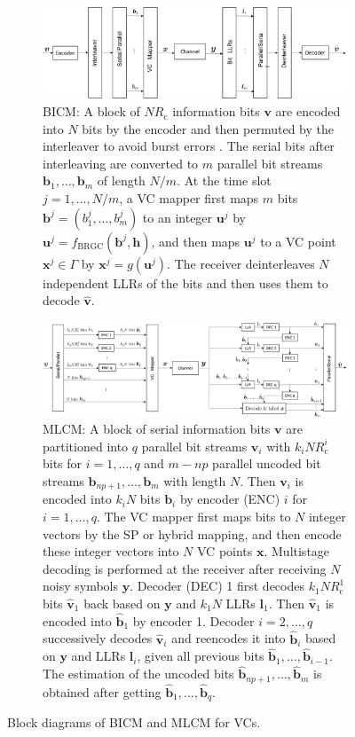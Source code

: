 \documentclass[journal]{IEEEtran}
\newcommand{\bb}{\boldsymbol{b}}
\newcommand{\bh}{\boldsymbol{h}}
\newcommand{\bl}{\boldsymbol{l}}
\newcommand{\bu}{\boldsymbol{u}}
\newcommand{\bv}{\boldsymbol{v}}
\newcommand{\bx}{\boldsymbol{x}}
\newcommand{\by}{\boldsymbol{y}}
\newcommand{\Rc}{R_\mathrm{c}}
\begin{document}
\begin{figure}[tbp]
\centering
\begin{subfigure}{\linewidth}
    \centering
    \includegraphics[width=5.4in]{figures/BICM.png}
    \caption{BICM: A block of $N\Rc$ information bits $\bv$ are encoded into $N$ bits by the encoder and then permuted by the interleaver to avoid burst errors \cite{caire98}. The serial bits after interleaving are converted to $m$ parallel bit streams $\bb_1,\ldots,\bb_m$ of length $N/m$. At the time slot $j=1,\ldots,N/m$, a VC mapper first maps $m$ bits $\bb^j=(b_1^j,\dots,b_m^j)$ to an integer $\bu^j$ by $\bu^j=f_{\text{BRGC}}\left(\bb^j,\bh\right)$, and then maps $\bu^j$ to a VC point $\bx^j \in \Gamma$ by $\bx^j=g(\bu^j)$. The receiver deinterleaves $N$ independent LLRs of the bits and then uses them to decode $\hat{\bv}$.}
    \label{Fig:BICM}
    \end{subfigure}
    \begin{subfigure}{\linewidth}
        \centering
        \includegraphics[width=7in]{figures/MLCM.png}%
        \caption{MLCM: A block of serial information bits $\bv$ are partitioned into $q$ parallel bit streams $\bv_i$ with $k_iN\Rc^{i}$ bits for $i=1,\ldots,q$ and $m-np$ parallel uncoded bit streams $\bb_{np+1},\ldots,\bb_m$ with length $N$. Then $\bv_i$ is encoded into $k_iN$ bits $\bb_i$ by encoder (ENC) $i$ for $i=1,\ldots,q$. The VC mapper first maps bits to $N$ integer vectors by the SP or hybrid mapping, and then encode these integer vectors into $N$ VC points $\bx$. Multistage decoding is performed at the receiver after receiving $N$ noisy symbols $\by$. Decoder (DEC) 1 first decodes $k_1N\Rc^1$ bits $\hat{\bv}_1$ back based on $\by$ and $k_1N$ LLRs $\bl_1$. Then $\hat{\bv}_1$ is encoded into $\hat{\bb}_1$ by encoder 1. Decoder $i=2,\ldots,q$ successively decodes $\hat{\bv}_i$ and reencodes it into $\hat{\bb}_i$ based on $\by$ and LLRs $\bl_i$, given all previous bits $\hat{\bb}_1,\dots,\hat{\bb}_{i-1}$. The estimation of the uncoded bits $\hat{\bb}_{np+1},\ldots,\hat{\bb}_m$ is obtained after getting $\hat{\bb}_1,\dots,\hat{\bb}_{q}$.}
        \label{Fig:MLCM}
    \end{subfigure}
    \caption{Block diagrams of BICM and MLCM for VCs.}
    \label{Fig:CM}
\end{figure}
\end{document}
